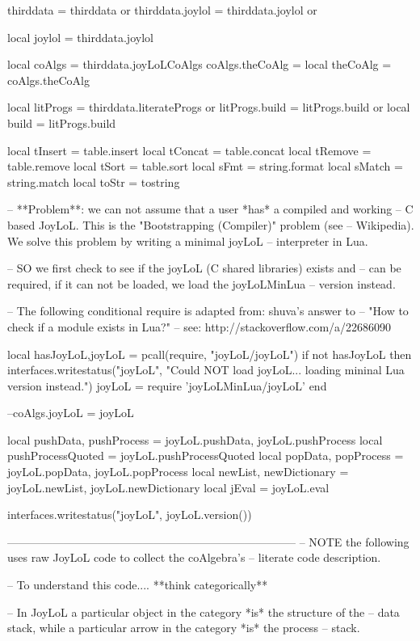 thirddata        = thirddata        or {}
thirddata.joylol = thirddata.joylol or {}

local joylol     = thirddata.joylol

local coAlgs     = thirddata.joyLoLCoAlgs
coAlgs.theCoAlg  = {}
local theCoAlg   = coAlgs.theCoAlg

local litProgs   = thirddata.literateProgs or {}
litProgs.build   = litProgs.build or {}
local build      = litProgs.build

local tInsert = table.insert
local tConcat = table.concat
local tRemove = table.remove
local tSort   = table.sort
local sFmt    = string.format
local sMatch  = string.match
local toStr   = tostring

-- **Problem**: we can not assume that a user *has* a compiled and working 
-- C based JoyLoL. This is the "Bootstrapping (Compiler)" problem (see 
-- Wikipedia). We solve this problem by writing a minimal joyLoL 
-- interpreter in Lua. 

-- SO we first check to see if the joyLoL (C shared libraries) exists and 
-- can be required, if it can not be loaded, we load the joyLoLMinLua 
-- version instead. 

-- The following conditional require is adapted from: shuva's answer to 
--  "How to check if a module exists in Lua?"
-- see: http://stackoverflow.com/a/22686090

local hasJoyLoL,joyLoL = pcall(require, "joyLoL/joyLoL")
if not hasJoyLoL then
  interfaces.writestatus("joyLoL",
    "Could NOT load joyLoL... loading mininal Lua version instead.")
  joyLoL = require 'joyLoLMinLua/joyLoL'
end

--coAlgs.joyLoL = joyLoL

local pushData, pushProcess = joyLoL.pushData, joyLoL.pushProcess
local pushProcessQuoted = joyLoL.pushProcessQuoted
local popData, popProcess   = joyLoL.popData, joyLoL.popProcess
local newList, newDictionary = joyLoL.newList, joyLoL.newDictionary
local jEval = joyLoL.eval

interfaces.writestatus("joyLoL", joyLoL.version())

-----------------------------------------------------------------------------
-- NOTE the following uses raw JoyLoL code to collect the coAlgebra's 
-- literate code description.

-- To understand this code.... **think categorically**

-- In JoyLoL a particular object in the category *is* the structure of the 
-- data stack, while a particular arrow in the category *is* the process 
-- stack.


